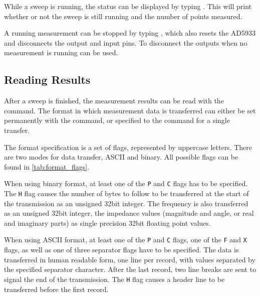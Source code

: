 While a sweep is running, the status can be displayed by typing . This will print whether or not
the sweep is still running and the number of points measured.

A running measurement can be stopped by typing , which also resets the AD5933 and disconnects the
output and input pins. To disconnect the outputs when no measurement is running  can be used.

\subsection{Reading Results}

After a sweep is finished, the measurement results can be read with the  command.
The format in which measurement data is transferred can either be set permanently with the
 command, or specified to the  command for a single transfer.

The format specification is a set of flags, represented by uppercase letters. There are two modes for data transfer,
ASCII and binary. All possible flags can be found in \autoref{tab:format_flags}.

When using binary format, at least one of the \texttt{P} and \texttt{C} flags has to be specified. The \texttt{H} flag
causes the number of bytes to follow to be transferred at the start of the transmission as an unsigned \unit{32}{bit}
integer. The frequency is also transferred as an unsigned \unit{32}{bit} integer, the impedance values (magnitude and
angle, or real and imaginary parts) as single precision \unit{32}{bit} floating point values.

When using ASCII format, at least one of the \texttt{P} and \texttt{C} flags, one of the \texttt{F} and \texttt{X}
flags, as well as one of three separator flags have to be specified. The data is transferred in human readable form,
one line per record, with values separated by the specified separator character. After the last record, two line breaks
are sent to signal the end of the transmission. The \texttt{H} flag causes a header line to be transferred before the
first record.

